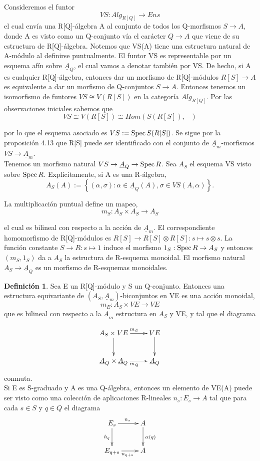 \documentclass[12pt,spanish]{amsart}
\newcommand{\set}[1]{\left\{{#1}\right\}}
\def\Spec{\mathop{\mbox{\normalfont Spec}}\nolimits}
\theoremstyle{definition}
\newtheorem{Def}[Theorem]{Definición}
\theoremstyle{remark}
\begin{document}
Consideremos el funtor
$$VS: Alg_{R[Q]} \to Ens$$
el cual envía una R[Q]-álgebra A al conjunto de todos los Q-morfismos $S \to A$, donde A es visto como un Q-conjunto vía el carácter $Q \to A$ que viene de su estructura de R[Q]-álgebra. Notemos que VS(A) tiene una estructura natural de A-módulo al definirse puntualmente. El funtor VS es representable por un esquema afín sobre $\underline{A}_{Q}$, el cual vamos a denotar también por VS. De hecho, si A es cualquier R[Q]-álgebra, entonces dar un morfismo de R[Q]-módulos $R[S] \to A$ es equivalente a dar un morfismo de Q-conjuntos $S \to A$. Entonces tenemos un isomorfismo de funtores $VS \cong V(R[S])$ en la categoría $Alg_{R[Q]}$. Por las observaciones iniciales sabemos que 
$$VS\cong V(R[S]) \cong Hom(S(R[S]),-)$$

por lo  que el esquema asociado es $VS := \Spec{S(R[S])}$. Se sigue por la proposición 4.13 que R[S] puede ser identificado con el conjunto de $\underline{A}_{m}$-morfismos $VS \to \underline{A}_{m}$. \\ 
Tenemos un morfismo natural $VS \to \underline{A}_{Q} \to \Spec{R}$. Sea $A_{S}$ el esquema VS visto sobre $\Spec{R}$. Explícitamente, si A es una R-álgebra,
$$A_{S}(A):= \set{(\alpha,\sigma):\alpha \in \underline{A}_{Q}(A), \sigma \in VS(A,\alpha)}.$$

La multiplicación puntual define un mapeo,
$$m_{S}:A_{S} \times A_{S} \to A_{S}$$ 

el cual es bilineal con respecto a la acción de $\underline{A}_{m}$. El correspondiente homomorfismo  de R[Q]-módulos es $R[S] \to R[S] \otimes R[S]:s \mapsto  s\otimes s$. La función constante $S \to R:s \mapsto 1$ induce el morfismo $1_{S}: \Spec{R} \to A_{S}$ y entonces $(m_{S},1_{S})$ da a $A_{S}$ la estructura de R-esquema monoidal. El morfismo natural $A_{S} \to \underline{A}_{Q}$ es un morfismo de R-esquemas monoidales.   


\begin{Def}
 Sea E un R[Q]-módulo y S un Q-conjunto. Entonces una estructura equivariante de $(A_{S},\underline{A}_{m})$-biconjuntos en VE es una acción monoidal,
 $$m_{E}: A_{S} \times VE \to VE$$
que es bilineal con respecto a la $\underline{A}_{m}$ estructura en $A_{S}$ y VE, y tal que el diagrama
\end{Def}

$$\xymatrix{
A_{S} \times VE \ar[d] \ar[r]^{m_{E}} & VE \ar[d] \\
\underline{A}_{Q} \times \underline{A}_{Q} \ar[r]_{m_{Q}} & \underline{A}_{Q}
}
$$
conmuta. \\
Si E es S-graduado y A es una Q-álgebra, entonces un elemento de VE(A) puede ser visto como una colección de aplicaciones R-lineales $n_{s}:E_{s} \to A$ tal que para cada $s\in S$ y $q\in Q$ el diagrama
$$\xymatrix{
E_{s} \ar[d]_{h_{q}} \ar[r]^{n_{s}} & A \ar[d]^{\alpha(q)} \\ 
E_{q+s} \ar[r]_{n_{q+s}} & A
}
$$
\end{document}
